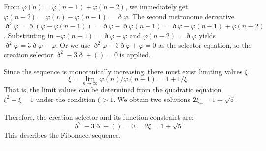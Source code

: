\documentclass[11pt,a4paper,oneside]{article}
\newcommand{\ethop}{\eth}
\newcommand{\hr}{\par\vspace{2em}\noindent\rule{\linewidth}{0.4pt}\par\vspace{2em}}
\begin{document}
From $\varphi(n)= \varphi(n-1)+ \varphi(n-2)$, we immediately get $\varphi(n-2)= \varphi(n)-\varphi(n-1)=\ethop\varphi$.
The second metronome derivative $\ethop^2 \varphi = \ethop(\varphi- \varphi(n-1))=\ethop\varphi-\ethop\varphi(n-1)= \ethop\varphi- \varphi(n-1)+ \varphi(n-2)$. Substituting in $-\varphi(n-1)=\ethop\varphi- \varphi$ and $\varphi(n-2)=\ethop\varphi$ yields $\ethop^2 \varphi =3\ethop\varphi-\varphi$.
Or we use $\ethop^2 \varphi-3\ethop\varphi + \varphi = 0$ as the selector equation, so the creation selector $\ethop^2 -3\ethop +()= 0$ is applied.

Since the sequence is monotonically increasing, there must exist limiting values $\xi$.
\begin{equation*}
    \xi = \lim_{n \to \infty} \varphi(n)/ \varphi(n-1) = 1 + 1 / \xi
\end{equation*}
That is, the limit values can be determined from the quadratic equation $\xi^2- \xi = 1$ under the condition $\xi > 1$. We obtain two solutions $2 \xi_{\pm} = 1 \pm \sqrt {5}$.

Therefore, the creation selector and its function constraint are:
\begin{equation}
    \ethop^2-3\ethop+()= 0,\quad 2 \xi = 1+ \sqrt {5} \tag {M14}
\end{equation}
This describes the Fibonacci sequence.

\hr
\end{document}
